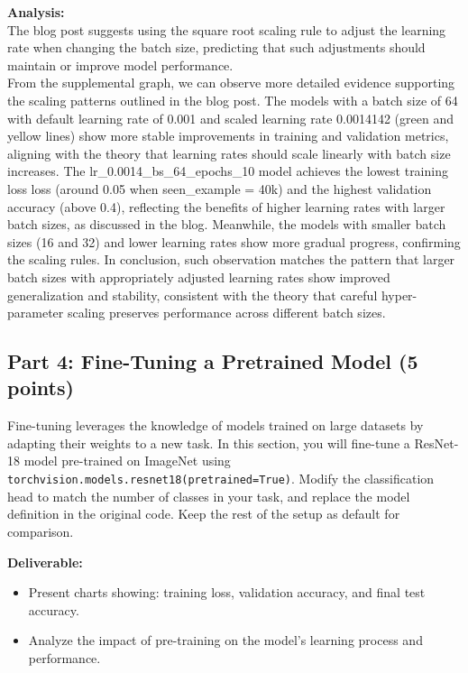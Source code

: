 \documentclass[11pt, oneside]{article}   	%
\begin{document}
\textbf{Analysis: }
\\
The blog post suggests using the square root scaling rule to adjust the learning rate when changing the batch size, predicting that such adjustments should maintain or improve model performance.
\\
From the supplemental graph, we can observe more detailed evidence supporting the scaling patterns outlined in the blog post. The models with a batch size of 64 with default learning rate of 0.001 and scaled learning rate 0.0014142 (green and yellow lines) show more stable improvements in training and validation metrics, aligning with the theory that learning rates should scale linearly with batch size increases. The lr\_0.0014\_bs\_64\_epochs\_10 model achieves the lowest training loss loss (around 0.05 when seen\_example = 40k) and the highest validation accuracy (above 0.4), reflecting the benefits of higher learning rates with larger batch sizes, as discussed in the blog. Meanwhile, the models with smaller batch sizes (16 and 32) and lower learning rates show more gradual progress, confirming the scaling rules. In conclusion, such observation matches the pattern that larger batch sizes with appropriately adjusted learning rates show improved generalization and stability, consistent with the theory that careful hyper-parameter scaling preserves performance across different batch sizes.

\subsection*{Part 4: Fine-Tuning a Pretrained Model (5 points)}
Fine-tuning leverages the knowledge of models trained on large datasets by adapting their weights to a new task. In this section, you will fine-tune a ResNet-18 model pre-trained on ImageNet using \texttt{torchvision.models.resnet18(pretrained=True)}. Modify the classification head to match the number of classes in your task, and replace the model definition in the original code. Keep the rest of the setup as default for comparison.

\noindent\textbf{Deliverable:}
\begin{itemize}
    \item Present charts showing: training loss, validation accuracy, and final test accuracy.
    \item Analyze the impact of pre-training on the model's learning process and performance.
\end{itemize}
\end{document}
